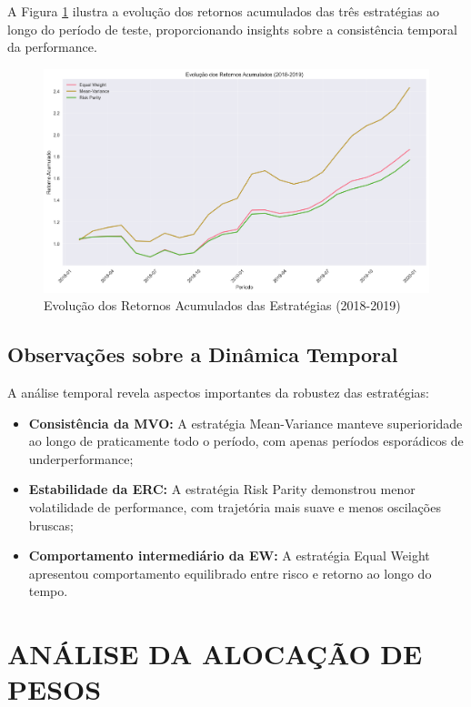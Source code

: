 A Figura \ref{fig:retornos_acumulados} ilustra a evolução dos retornos acumulados das três estratégias ao longo do período de teste, proporcionando insights sobre a consistência temporal da performance.

\begin{figure}[htbp]
\centering
\includegraphics[width=\textwidth]{../results/figures/retornos_acumulados.png}
\caption{Evolução dos Retornos Acumulados das Estratégias (2018-2019)}
\label{fig:retornos_acumulados}
\end{figure}

\subsection{Observações sobre a Dinâmica Temporal}

A análise temporal revela aspectos importantes da robustez das estratégias:

\begin{itemize}
    \item \textbf{Consistência da MVO:} A estratégia Mean-Variance manteve superioridade ao longo de praticamente todo o período, com apenas períodos esporádicos de underperformance;
    
    \item \textbf{Estabilidade da ERC:} A estratégia Risk Parity demonstrou menor volatilidade de performance, com trajetória mais suave e menos oscilações bruscas;
    
    \item \textbf{Comportamento intermediário da EW:} A estratégia Equal Weight apresentou comportamento equilibrado entre risco e retorno ao longo do tempo.
\end{itemize}

\section{ANÁLISE DA ALOCAÇÃO DE PESOS}

